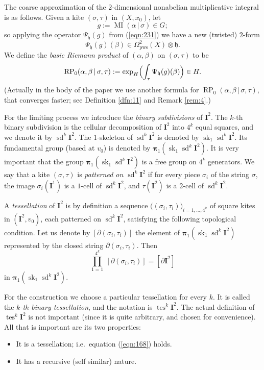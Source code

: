 \documentclass[10pt, a4paper]{amsart}
\theoremstyle{definition}
\numberwithin{equation}{section}
\newcommand{\opn}{\operatorname}
\newcommand{\mfrak}[1]{\mathfrak{#1}}
\newcommand{\mbf}[1]{\mathbf{#1}}
\newcommand{\mrm}[1]{\mathrm{#1}}
\newcommand{\bsym}[1]{\boldsymbol{#1}}
\renewcommand{\vert}{\, | \,}
\newcommand{\h}{\mfrak{h}}
\newcommand{\lb}{\linebreak}
\begin{document}
The coarse approximation of the $2$-dimensional
nonabelian multiplicative integral is as follows. 
Given a kite  $(\sigma, \tau)$ in $(X, x_0)$, let
\[ g := \opn{MI}(\alpha \vert \sigma) \in G ; \]
so applying the operator $\Psi_{\h}(g)$ from (\ref{eqn:231})
we have a new (twisted) $2$-form
\[ \Psi_{\h}(g)(\beta) \in \Omega_{\mrm{pws}}^2(X) \otimes \h . \]
We define the {\em basic Riemann product} 
of $(\alpha, \beta)$ on $(\sigma, \tau)$ to be
\begin{equation} \label{eqn:238}
\opn{RP}_0(\alpha, \beta \vert \sigma, \tau) :=
 \exp_H \Bigl( \int_{\tau} \Psi_{\h}(g)(\beta) \Bigr) \in H .
\end{equation}
(Actually in the body of the paper we use another formula for \lb
$\opn{RP}_0(\alpha, \beta \vert \sigma, \tau)$, that converges
faster; see Definition \ref{dfn:11} and Remark \ref{rem:4}.)

For the limiting process we introduce the {\em binary
subdivisions} of $\mbf{I}^2$. The $k$-th binary subdivision is the cellular
decomposition of $\mbf{I}^2$ into $4^k$ equal squares, and we denote it by
$\opn{sd}^k \mbf{I}^2$. The $1$-skeleton of $\opn{sd}^k \mbf{I}^2$ is denoted
by $\opn{sk}_1 \opn{sd}^k \mbf{I}^2$. Its fundamental group (based at $v_0$) is
denoted by
$\bsym{\pi}_1(\opn{sk}_1 \opn{sd}^k \mbf{I}^2)$. 
It is very important that the group 
$\bsym{\pi}_1(\opn{sk}_1 \opn{sd}^k \mbf{I}^2)$ is a  free group on $4^k$
generators. 
We say that a kite $(\sigma, \tau)$ is {\em patterned on $\opn{sd}^k \mbf{I}^2$}
if for every piece $\sigma_i$ of the string $\sigma$, the image
$\sigma_i(\mbf{I}^1)$ is a $1$-cell of $\opn{sd}^k \mbf{I}^2$, and
$\tau(\mbf{I}^2)$ is a $2$-cell of $\opn{sd}^k \mbf{I}^2$.

A {\em tessellation} of $\mbf{I}^2$ is by definition a sequence
$\bigl( (\sigma_i, \tau_i) \bigr)_{i = 1, \ldots, 4^k}$
of square kites in $(\mbf{I}^2, v_0)$, each patterned on 
$\opn{sd}^k \mbf{I}^2$, satisfying the following topological condition.
Let us denote by $[\partial (\sigma_i, \tau_i)]$ the element of
$\bsym{\pi}_1(\opn{sk}_1 \opn{sd}^k \mbf{I}^2)$
represented by the closed string $\partial (\sigma_i, \tau_i)$. Then
\begin{equation} \label{eqn:168}
\prod_{1 = 1}^{4^k}\ [\partial (\sigma_i, \tau_i)] = 
[\partial \mbf{I}^2] 
\end{equation}
in $\bsym{\pi}_1(\opn{sk}_1 \opn{sd}^k \mbf{I}^2)$.

For the construction we choose a particular tessellation for every $k$. It is
called the {\em $k$-th binary tessellation}, and the notation is
$\opn{tes}^k  \mbf{I}^2$. The actual definition of $\opn{tes}^k  \mbf{I}^2$
is not important (since it is
quite arbitrary, and chosen for convenience). All that is important are its two
properties:
\begin{itemize}
\item It is a tessellation; i.e.\ equation (\ref{eqn:168}) holds.
\item It has a recursive (self similar) nature.
\end{itemize}
\end{document}
